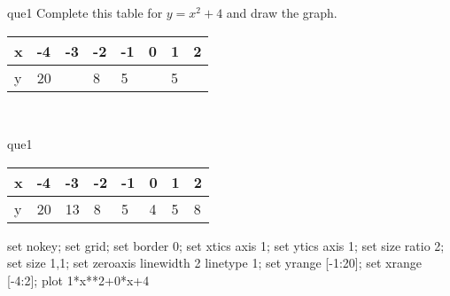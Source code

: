 \documentclass[13.5pt, varwidth=true]{beamer}
\begin{document}
\begin{frame}[shrink=19,fragile]
	\begin{beamercolorbox}[rounded=true, left, shadow=true,wd=14.8cm]{que1}
		 Complete this table for $y = x^{2} + 4$ and draw the graph. \\[0.3cm] \renewcommand{\arraystretch}{1.2}\begin{tabular}{|C|C|C|C|C|C|C|C|} \hline x & -4 & -3 & -2 & -1 & 0 & 1 & 2 \\ \hline y & 20 &  & 8 & 5 &  & 5 & \\ \hline \end{tabular}\\[0.3cm]
	\end{beamercolorbox}
\end{frame}
\begin{frame}[shrink=19,fragile]
	\begin{beamercolorbox}[rounded=true, left, shadow=true,wd=14.8cm]{que1}
		\renewcommand{\arraystretch}{1.2}\begin{tabular}{|C|C|C|C|C|C|C|C|} \hline x & -4 & -3 & -2 & -1 & 0 & 1 & 2 \\ \hline y & 20 & 13 & 8 & 5 & 4 & 5 & 8\\ \hline \end{tabular}\begin{gnuplot}[terminal=pdf] set nokey; set grid; set border 0; set xtics axis 1; set ytics axis 1; set size ratio 2; set size 1,1; set zeroaxis linewidth 2 linetype 1; set yrange [-1:20]; set xrange [-4:2]; plot 1*x**2+0*x+4 \end{gnuplot}
	\end{beamercolorbox}
\end{frame}
\end{document}
